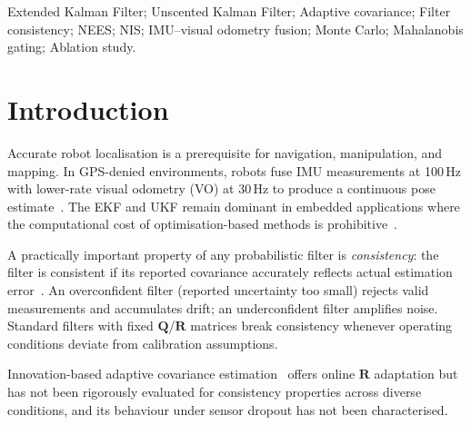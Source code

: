 \documentclass[letterpaper, 10pt, journal]{IEEEtran}
\newcommand{\bmQ}{\bm{Q}}
\newcommand{\bmR}{\bm{R}}
\begin{document}
\begin{IEEEkeywords}
Extended Kalman Filter; Unscented Kalman Filter; Adaptive covariance;
Filter consistency; NEES; NIS; IMU--visual odometry fusion; Monte Carlo;
Mahalanobis gating; Ablation study.
\end{IEEEkeywords}

\section{Introduction}
\label{sec:intro}

Accurate robot localisation is a prerequisite for navigation, manipulation, and
mapping. In GPS-denied environments, robots fuse IMU measurements at 100\,Hz
with lower-rate visual odometry (VO) at 30\,Hz to produce a continuous pose
estimate~\cite{mourikis2007msckf,geneva2020openvins}. The EKF and UKF remain
dominant in embedded applications where the computational cost of
optimisation-based methods is prohibitive~\cite{thrun2005probabilistic}.

A practically important property of any probabilistic filter is
\emph{consistency}: the filter is consistent if its reported covariance
accurately reflects actual estimation error~\cite{barshalom2001estimation}.
An overconfident filter (reported uncertainty too small) rejects valid
measurements and accumulates drift; an underconfident filter amplifies noise.
Standard filters with fixed $\bmQ$/$\bmR$ matrices break consistency whenever
operating conditions deviate from calibration assumptions.

Innovation-based adaptive covariance estimation~\cite{mohamed1999adaptive,
akhlaghi2017adaptive} offers online $\bmR$ adaptation but has not been
rigorously evaluated for consistency properties across diverse conditions, and
its behaviour under sensor dropout has not been characterised.
\end{document}
